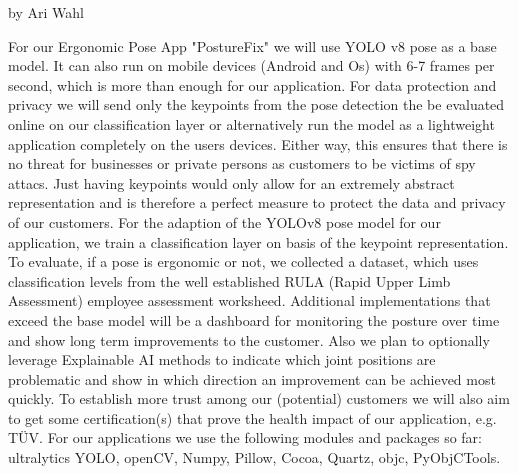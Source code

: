 
by Ari Wahl

For our Ergonomic Pose App "PostureFix" we will use YOLO v8 pose as a base model. It can also run on mobile devices (Android and Os) with 6-7 frames per second\cite{https://github.com/ultralytics/ultralytics/issues/4333}, which is more than enough for our application. For data protection and privacy we will send only the keypoints from the pose detection the be evaluated online on our classification layer or alternatively run the model as a lightweight application completely on the users devices. Either way, this ensures that there is no threat for businesses or private persons as customers to be victims of spy attacs. Just having keypoints would only allow for an extremely abstract representation and is therefore a perfect measure to protect the data and privacy of our customers. For the adaption of the YOLOv8 pose model for our application, we train a classification layer on basis of the keypoint representation. To evaluate, if a pose is ergonomic or not, we collected a dataset, which uses classification levels from the well established RULA (Rapid Upper Limb Assessment) employee assessment worksheed\cite{https://www.researchgate.net/publication/362455275_Home_office_versus_ergonomic_workstation_-_is_the_ergonomic_risk_increased_when_working_at_the_dining_table_An_inertial_motion_capture_based_pilot_study}. Additional implementations that exceed the base model will be a dashboard for monitoring the posture over time and show long term improvements to the customer. Also we plan to optionally leverage Explainable AI methods to indicate which joint positions are problematic and show in which direction an improvement can be achieved most quickly. To establish more trust among our (potential) customers we will also aim to get some certification(s) that prove the health impact of our application, e.g. TÜV. For our applications we use the following modules and packages so far: ultralytics YOLO, openCV, Numpy, Pillow, Cocoa, Quartz, objc, PyObjCTools. 


